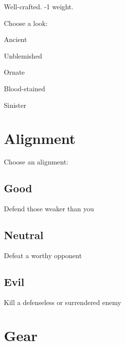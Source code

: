  
\item Well-crafted. -1 weight.


\stopitemize
 

Choose a look:

 
\startitemize[1,packed]

\item Ancient

 
\item Unblemished

 
\item Ornate

 
\item Blood-stained

 
\item Sinister


\stopitemize




 
\section{Alignment}   
 
\startInstructionsAfterHeader
Choose an alignment:
\stopInstructionsAfterHeader
 


\subsection{Good}   
 

Defend those weaker than you

 
\subsection{Neutral}   
 

Defeat a worthy opponent

 
\subsection{Evil}   
 

Kill a defenseless or surrendered enemy



 
\section{Gear}   
 



